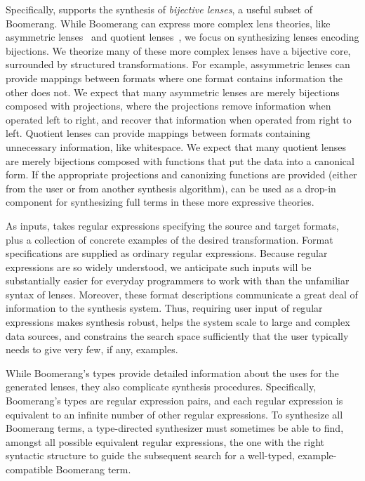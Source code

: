 \documentclass[acmsmall,screen]{acmart}
\begin{document}
Specifically, \Optician{} supports the synthesis of \emph{bijective lenses}, a
useful subset of Boomerang.  While Boomerang can express more complex lens
theories, like asymmetric lenses~\cite{Focal2005-long} and quotient
lenses~\cite{QuotientLenses08}, we focus on synthesizing lenses encoding bijections.
We theorize many of these more complex lenses have a bijective core, surrounded
by structured transformations.
For example, assymmetric lenses can provide mappings between formats where one
format contains information the other does not.  We expect that many asymmetric
lenses are merely bijections composed with projections, where the projections remove
information when operated left to right, and recover that information when
operated from right to left.
Quotient lenses can provide mappings between formats containing unnecessary
information, like whitespace.  We expect that many quotient lenses are merely
bijections composed with functions that put the data into a canonical form.
If the appropriate projections and canonizing functions are provided
(either from the user or from another synthesis algorithm),
\Optician{} can be used as a drop-in component for synthesizing full terms in
these more expressive theories.

As inputs, \Optician{} takes regular expressions specifying the source and
target formats, plus a collection of concrete examples of the desired 
transformation.  Format specifications are supplied as ordinary regular
expressions.
Because regular expressions are so widely understood, we anticipate such
inputs will be substantially easier for everyday programmers to work with
than the unfamiliar syntax of lenses.
Moreover, these format descriptions communicate a
great deal of information to the synthesis system.  Thus, requiring user input
of regular expressions makes synthesis robust, 
helps the system scale to large and complex data sources, and 
constrains the search space sufficiently that the user typically needs
to give very few, if any, examples.

While Boomerang's types provide detailed information about the uses for the
generated lenses, they also complicate synthesis procedures.
Specifically, Boomerang's types are regular expression
pairs, and each regular expression is equivalent to an infinite
number of other regular expressions.
To synthesize all Boomerang terms, a type-directed synthesizer
must sometimes be able to find, amongst all possible equivalent
regular expressions, the one with the right
syntactic structure to guide the subsequent search for a 
well-typed, example-compatible Boomerang term.  
\end{document}
